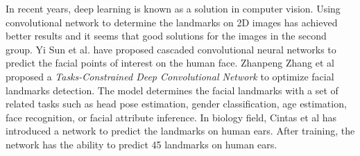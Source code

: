 \documentclass[conference]{IEEEtran}
\begin{document}
In recent years, deep learning is known as a solution in computer vision. Using convolutional network to determine the landmarks on 2D images has achieved better results and it seems that good solutions for the images in the second group. Yi Sun et al.\cite{sun2013deep} have proposed cascaded convolutional neural networks to predict the facial points of interest on the human face.
Zhanpeng Zhang et al\cite{zhang2014facial} proposed a \textit{Tasks-Constrained Deep Convolutional Network} to optimize facial landmarks detection. The model determines the facial landmarks with a set of related tasks such as head pose estimation, gender classification, age estimation, face recognition, or facial attribute inference. In biology field, Cintas et al\cite{cintas2016automatic} has introduced a network to predict the landmarks on human ears. After training, the network has the ability to predict 45 landmarks on human ears.

\end{document}
